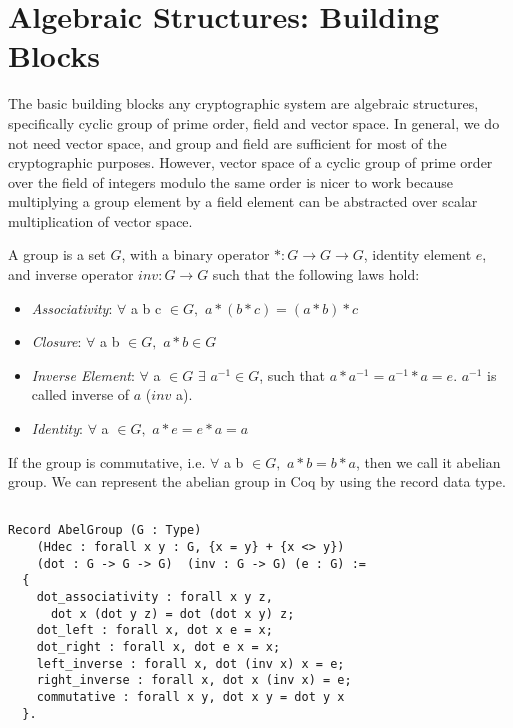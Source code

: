 \section{Algebraic Structures: Building Blocks}
\label{sec:algebra}
The basic building blocks any cryptographic system are algebraic structures, specifically cyclic group of prime order, field and vector space. In general, 
we do not need vector space, and group and field are sufficient for most of the cryptographic purposes. However,
vector space  of a cyclic group of prime order over the field of integers modulo the same order is nicer to work 
because multiplying a group element by a field element can be abstracted over scalar multiplication of vector space.

\begin{definition}[Group] 
A group is a set $G$, with a binary operator $* : G \rightarrow G \rightarrow G$, identity element $e$, and inverse operator $inv : G \rightarrow G$ such 
    that the following laws hold:  \end{definition} 
    \begin{itemize}
     \item \textit{Associativity}: $\forall$  a b c $\in G,$  $a * (b * c) = (a * b) * c$
    \item \textit{Closure}: $\forall$ a b $\in G,$  $a * b \in G$
    \item \textit{Inverse Element}: $\forall$ a $\in G$ $\exists$ $a^{-1} \in G$, such that $a * a^{-1} = a^{-1} * a = e$. $a^{-1}$ is called inverse of $a$ ($inv$ a).
    \item \textit{Identity}: $\forall$ a $\in G,$  $a * e = e * a  = a$
    \end{itemize}
  
    \noindent
    If the group is commutative, i.e. $\forall$ a b $\in  G,$  $a * b = b * a$, then we call it abelian group.  We can represent the abelian group in Coq by using the 
    record data type. 
 
 \begin{verbatim}

Record AbelGroup (G : Type) 
    (Hdec : forall x y : G, {x = y} + {x <> y}) 
    (dot : G -> G -> G)  (inv : G -> G) (e : G) :=
  {
    dot_associativity : forall x y z, 
      dot x (dot y z) = dot (dot x y) z;
    dot_left : forall x, dot x e = x;
    dot_right : forall x, dot e x = x;
    left_inverse : forall x, dot (inv x) x = e;
    right_inverse : forall x, dot x (inv x) = e;
    commutative : forall x y, dot x y = dot y x
  }.
  
\end{verbatim}

